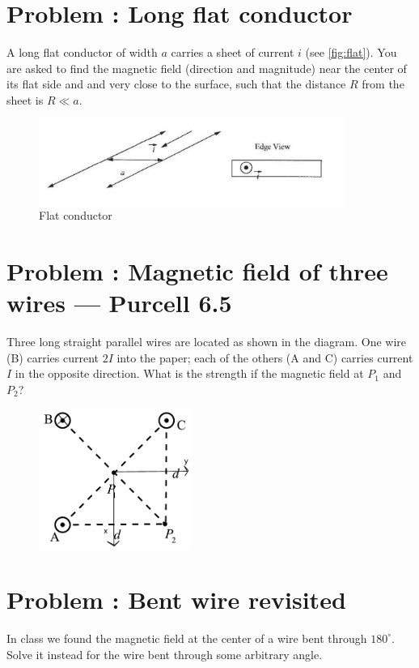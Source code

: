 \documentclass[problems]{esg8022pset}
\date{\today }
\begin{document}
\section{Problem \thesection: Long flat conductor}
  A long flat conductor of width $a$ carries a sheet of current $i$ (see
  \autoref{fig:flat}). You are asked to find the magnetic field (direction and
  magnitude) near the center of its flat side and and very close to the
  surface, such that the distance $R$ from the sheet is $R \ll a$.

  \begin{figure}[H]
    \centering
    \includegraphics[width = 10cm]{flat_conductor}
    \caption{Flat conductor}
    \label{fig:flat}
  \end{figure}
\section{Problem \thesection: Magnetic field of three wires --- Purcell 6.5}
  Three long straight parallel wires are located as shown in the diagram. One
  wire (B) carries current $2 I$ into the paper; each of the others (A and C)
  carries current $I$ in the opposite direction. What is the strength if the
  magnetic field at $P_1$ and $P_{2}$?
  \begin{figure}[H]
    \centering
    \includegraphics[width = 5cm]{Threewires}
  \end{figure}
\section{Problem \thesection: Bent wire revisited}
  In class we found the magnetic field at the center of a wire bent through
  $180^\circ$.  Solve it instead for the wire bent through some arbitrary
  angle.
\end{document}
